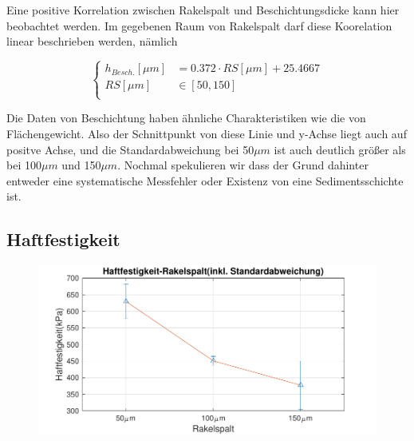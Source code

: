 \documentclass[12pt,UTF8]{article}
\begin{document}
Eine positive Korrelation zwischen Rakelspalt und Beschichtungsdicke kann hier beobachtet werden. Im gegebenen Raum von Rakelspalt darf diese Koorelation linear beschrieben werden, n\"amlich
\begin{center}
    \begin{equation}
        \left\{
        \begin{aligned}
            h_{Besch.}[\mu m] & =0.372\cdot RS[\mu m]+25.4667 \\
            RS[\mu m]         & \in [50,150]                  \\
        \end{aligned}
        \right.
    \end{equation}
\end{center}
Die Daten von Beschichtung haben \"ahnliche Charakteristiken wie die von
Fl\"achengewicht. Also der Schnittpunkt von diese Linie und y-Achse liegt auch auf positve Achse, und die Standardabweichung bei 50$\mu m$ ist auch deutlich gr\"o\ss er als bei 100$\mu m$ und 150$\mu m$. Nochmal spekulieren wir dass der Grund dahinter entweder eine systematische Messfehler oder Existenz von eine Sedimentsschichte ist.
\subsection{Haftfestigkeit}
\begin{figure}[H]
    \centering
    \includegraphics[]{Diagramme/Haftfestigkeit.pdf}
\end{figure}
\end{document}
